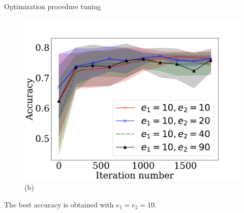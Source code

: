 \documentclass[12pt, aspectratio=169]{beamer}
\begin{document}
\begin{frame}{Optimization procedure tuning}
\begin{figure}
\begin{minipage}[h]{0.45\linewidth}
{    \includegraphics[width=\linewidth]{synth_period.pdf}\\(b)}
    \end{minipage}
    
    
\end{figure}
    
    \fontsize{12}{8}\selectfont
    The best accuracy is obtained with $e_1 = e_2=10$.
    
\end{frame}

    

\end{document}
